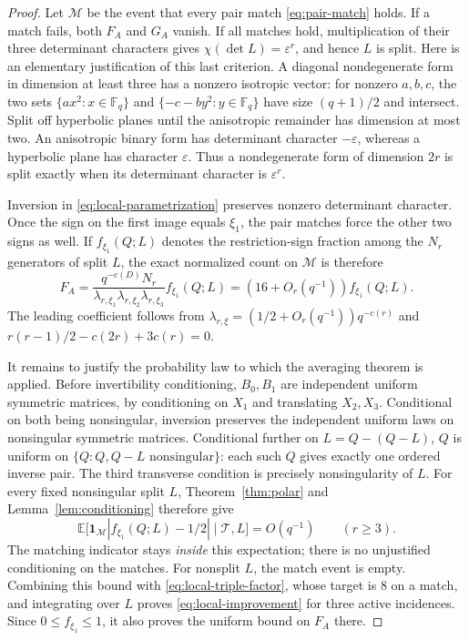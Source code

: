 \documentclass[11pt,a4paper]{article}
\theoremstyle{definition}
\theoremstyle{remark}
\newcommand{\F}{\mathbb F}
\newcommand{\E}{\mathbb E}
\newcommand{\eps}{\varepsilon}
\newcommand{\one}{\mathbf 1}
\begin{document}
\begin{proof}
Let $\mathcal M$ be the event that every pair match
\eqref{eq:pair-match} holds. If a match fails, both $F_A$ and $G_A$
vanish. If all matches hold, multiplication of their three determinant
characters gives $\chi(\det L)=\eps^r$, and hence $L$ is split.
Here is an elementary justification of this last criterion. A diagonal
nondegenerate form in dimension at least three has a nonzero isotropic
vector: for nonzero $a,b,c$, the two sets $\{ax^2:x\in\F_q\}$ and
$\{-c-by^2:y\in\F_q\}$ have size $(q+1)/2$ and intersect. Split off
hyperbolic planes until the anisotropic remainder has dimension at most
two. An anisotropic binary form has determinant character $-\eps$,
whereas a hyperbolic plane has character $\eps$. Thus a nondegenerate
form of dimension $2r$ is split exactly when its determinant character
is $\eps^r$.

Inversion in \eqref{eq:local-parametrization} preserves nonzero
determinant character. Once the sign on the first image equals
$\xi_1$, the pair matches force the other two signs as well. If
$f_{\xi_1}(Q;L)$ denotes the restriction-sign fraction among the
$N_r$ generators of split $L$, the exact normalized count on $\mathcal M$
is therefore
\begin{equation}\label{eq:local-triple-factor}
 F_A=\frac{q^{-c(D)}N_r}
 {\lambda_{r,\xi_1}\lambda_{r,\xi_2}\lambda_{r,\xi_3}}
 f_{\xi_1}(Q;L)
 =(16+O_r(q^{-1}))f_{\xi_1}(Q;L).
\end{equation}
The leading coefficient follows from
$\lambda_{r,\xi}=(1/2+O_r(q^{-1}))q^{-c(r)}$ and
$r(r-1)/2-c(2r)+3c(r)=0$.

It remains to justify the probability law to which the averaging theorem
is applied. Before invertibility conditioning, $B_0,B_1$ are independent
uniform symmetric matrices, by conditioning on $X_1$ and translating
$X_2,X_3$. Conditional on both being nonsingular, inversion preserves
the independent uniform laws on nonsingular symmetric matrices.
Conditional further on $L=Q-(Q-L)$, $Q$ is uniform on
$\{Q:Q,Q-L\text{ nonsingular}\}$: each such $Q$ gives exactly one
ordered inverse pair. The third transverse condition is precisely
nonsingularity of $L$. For every fixed nonsingular split $L$,
Theorem~\ref{thm:polar} and Lemma~\ref{lem:conditioning} therefore give
\[
 \E\bigl[\one_{\mathcal M}|f_{\xi_1}(Q;L)-1/2|
       \mid\mathcal T,L\bigr]=O(q^{-1})\qquad(r\ge3).
\]
The matching indicator stays \emph{inside} this expectation; there is
no unjustified conditioning on the matches. For nonsplit $L$, the match
event is empty. Combining this bound with
\eqref{eq:local-triple-factor}, whose target is $8$ on a match, and
integrating over $L$ proves \eqref{eq:local-improvement} for three active
incidences. Since $0\le f_{\xi_1}\le1$, it also proves the uniform bound
on $F_A$ there.


\end{proof}
\end{document}
